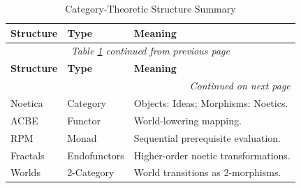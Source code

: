 \renewcommand{\arraystretch}{1.25}
\small
\begin{longtable}{p{2cm}|p{2.5cm}|p{7cm}}
\caption{Category-Theoretic Structure Summary}
\label{tab:category-summary} \\
\toprule
\textbf{Structure}
& \textbf{Type}
& \textbf{Meaning}
\\
\midrule
\endfirsthead
\multicolumn{3}{c}{\textit{Table \ref{tab:category-summary} continued from previous page}} \\
\toprule
\textbf{Structure}
& \textbf{Type}
& \textbf{Meaning}
\\
\midrule
\endhead
\midrule
\multicolumn{3}{r}{\textit{Continued on next page}} \\
\endfoot
\bottomrule
\endlastfoot

Noetica & Category & Objects: Ideas; Morphisms: Noetics. \\

ACBE & Functor & World-lowering mapping. \\

RPM & Monad & Sequential prerequisite evaluation. \\

Fractals & Endofunctors & Higher-order noetic transformations. \\

Worlds & 2-Category & World transitions as 2-morphisms. \\

\end{longtable}
\normalsize
